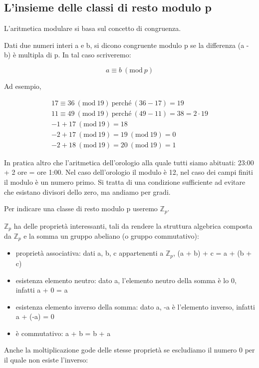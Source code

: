 \documentclass{book}
\theoremstyle{definition}
\newcommand{\Mod}[1]{\ (\mathrm{mod}\ #1)}
\newcommand{\Zp}{\mathbb{Z}_{p}}
\begin{document}
\subsection{L'insieme delle classi di resto modulo p}

L'aritmetica modulare si basa sul concetto di congruenza.

Dati due numeri interi a e b, si dicono congruente modulo p se la differenza (a - b) è multipla di p. In tal caso scriveremo:

$$
a \equiv b \Mod{p}
$$

Ad esempio, 

\begin{align*}
    17 \equiv 36 \Mod{19} \ \text{perché} \ (36 - 17) = 19 \\
    11 \equiv 49 \Mod{19} \ \text{perché} \ (49 - 11) = 38 = 2 \cdot 19 \\
    -1 + 17 \Mod{19} = 18 \\
    -2 + 17 \Mod{19} = 19 \Mod{19} = 0 \\
    -2 + 18 \Mod{19} = 20 \Mod{19} = 1
\end{align*}

In pratica altro che l'aritmetica dell'orologio alla quale tutti siamo abituati: 23:00 + 2 ore = ore 1:00.
Nel caso dell'orologio il modulo è 12, nel caso dei campi finiti il modulo è un numero primo. Si tratta di una condizione sufficiente ad evitare che esistano divisori dello zero, ma andiamo per gradi.

Per indicare una classe di resto modulo p useremo $\Zp$.

$\mathbb{Z}_{p}$ ha delle proprietà interessanti, tali da rendere la struttura algebrica composta da $\Zp$ e la somma un gruppo abeliano (o gruppo commutativo):

\begin{itemize}
    \item proprietà associativa: dati a, b, c appartenenti a $\Zp$, (a + b) + c = a + (b + c)
    \item esistenza elemento neutro: dato a, l’elemento neutro della somma è lo 0, infatti a + 0 = a
    \item esistenza elemento inverso della somma: dato a, -a è l’elemento inverso, infatti a + (-a) = 0
    \item è commutativo: a + b = b + a
\end{itemize}

Anche la moltiplicazione gode delle stesse proprietà se escludiamo il numero 0 per il quale non esiste l’inverso:
\end{document}
